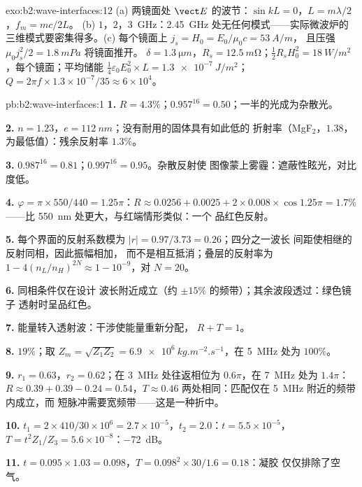 \begin{solution}{exo:b2:wave-interfaces:12}
(a) 两镜面处 $\vect E$ 的波节：$\sin kL = 0$，$L = m\lambda/2$，$f_m = mc/2L$。
(b) $1$，$2$，\qty{3}{GHz}：\qty{2.45}{GHz} 处无任何模式——实际微波炉的
三维模式要密集得多。(c) 每个镜面上 $j_s = H_0 = E_0/\mu_0c = \qty{53}{A/m}$，
且压强 $\mu_0j_s^2/2 = \qty{1.8}{mPa}$ 将镜面推开。
$\delta = \qty{1.3}{\micro m}$，$R_s = \qty{12.5}{m\ohm}$；$\tfrac12R_sH_0^2 =
\qty{18}{W/m^2}$，每个镜面；平均储能 $\tfrac14\varepsilon_0E_0^2 \times L = \qty{1.3e-7}{J/m^2}$；
$Q = 2\pi f \times 1.3 \times 10^{-7}/35 \approx 6 \times 10^4$。
\end{solution}

\begin{solution}{pb:b2:wave-interfaces:1}
\textbf{1.} $R = 4.3\%$；$0.957^{16} = 0.50$；一半的光成为杂散光。

\textbf{2.} $n = 1.23$，$e = \qty{112}{nm}$；没有耐用的固体具有如此低的
折射率（MgF$_2$，$1.38$，为最低值）：残余反射率 $1.3\%$。

\textbf{3.} $0.987^{16} = 0.81$；$0.997^{16} = 0.95$。杂散反射使
图像蒙上雾霾：遮蔽性眩光，对比度低。

\textbf{4.} $\varphi = \pi \times 550/440 = 1.25\pi$：$R \approx 0.0256 + 0.0025 + 2 \times 0.008 \times
\cos1.25\pi = 1.7\%$——比 \qty{550}{nm} 处更大，与红端情形类似：一个
品红色反射。

\textbf{5.} 每个界面的反射系数模为 $|r| = 0.97/3.73 = 0.26$；四分之一波长
间距使相继的反射同相，因此振幅相加，
而不是相互抵消；叠层的反射率为 $1 - 4(n_L/n_H)^{2N}
\approx 1 - 10^{-9}$，对 $N = 20$。

\textbf{6.} 同相条件仅在设计
波长附近成立（约 $\pm15\%$ 的频带）；其余波段透过：绿色镜子
透射时呈品红色。

\textbf{7.} 能量转入透射波：干涉使能量重新分配，
$R + T = 1$。

\textbf{8.} $19\%$；取 $Z_m = \sqrt{Z_1Z_2} = \qty{6.9e6}{kg.m^{-2}.s^{-1}}$，在
\qty{5}{MHz} 处为 $100\%$。

\textbf{9.} $r_1 = 0.63$，$r_2 = 0.62$；在 \qty{3}{MHz} 处往返相位为
$0.6\pi$，在 \qty{7}{MHz} 处为 $1.4\pi$：$R \approx 0.39 + 0.39 - 0.24 = 0.54$，$T \approx 0.46$
两处相同：匹配仅在 \qty{5}{MHz} 附近的频带内成立，而
短脉冲需要宽频带——这是一种折中。

\textbf{10.} $t_1 = 2 \times 410/30 \times 10^6 = 2.7 \times 10^{-5}$，$t_2 = 2.0$：$t = 5.5 \times 10^{-5}$，
$T = t^2Z_1/Z_3 = 5.6 \times 10^{-8}$：\qty{-72}{dB}。

\textbf{11.} $t = 0.095 \times 1.03 = 0.098$，$T = 0.098^2 \times 30/1.6 = 0.18$：凝胶
仅仅排除了空气。


\end{solution}
